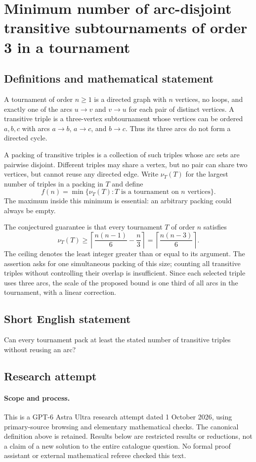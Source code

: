 \documentclass[11pt,a4paper]{article}
\begin{document}
\section*{Minimum number of arc-disjoint transitive subtournaments of order 3 in a tournament}\label{statement}

\subsection{Definitions and mathematical statement}
A tournament of order $n\geq1$ is a directed graph with $n$ vertices,
no loops, and exactly one of the arcs $u\to v$ and $v\to u$ for each
pair of distinct vertices. A transitive triple is a three-vertex
subtournament whose vertices can be ordered $a,b,c$ with arcs
$a\to b$, $a\to c$, and $b\to c$. Thus its three arcs do not form
a directed cycle.

A packing of transitive triples is a collection of such triples whose
arc sets are pairwise disjoint. Different triples may share a vertex, but no pair can share
two vertices, but cannot reuse any directed edge. Write $\nu_T(T)$
for the largest number of triples in a packing in $T$ and define
\[
 f(n)=\min\{\nu_T(T):T\text{ is a tournament on }n\text{ vertices}\}.
\]
The maximum inside this minimum is essential: an arbitrary packing
could always be empty.

The conjectured guarantee is that every tournament $T$ of order $n$
satisfies
\[
 \nu_T(T)\geq
 \left\lceil\frac{n(n-1)}6-\frac n3\right\rceil
 =\left\lceil\frac{n(n-3)}6\right\rceil.
\]
The ceiling denotes the least integer greater than or equal to its
argument. The assertion asks for one simultaneous packing of this
size; counting all transitive triples without controlling their
overlap is insufficient. Since each selected triple uses three arcs,
the scale of the proposed bound is one third of all arcs in the
tournament, with a linear correction.
\subsection{Short English statement}
Can every tournament pack at least the stated number of transitive triples without reusing an arc?
\subsection{Research attempt}
\paragraph{Scope and process.}
This is a GPT-6 Astra Ultra research attempt dated 1 October 2026, using
primary-source browsing and elementary mathematical checks. The canonical
definition above is retained. Results below are restricted results or
reductions, not a claim of a new solution to the entire catalogue question.
No formal proof assistant or external mathematical referee checked this text.
\end{document}
